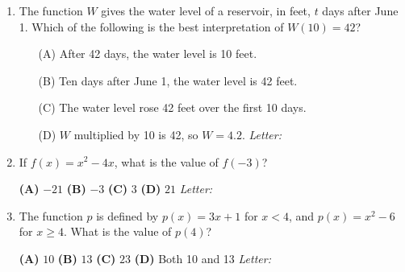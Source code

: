 \documentclass[10pt]{article}
\begin{document}
\begin{enumerate}[leftmargin=1.9em, itemsep=12pt]

\item The function $W$ gives the water level of a reservoir, in feet, $t$ days after June 1.
      Which of the following is the best interpretation of $W(10) = 42$?
      \begin{enumerate}[leftmargin=2.6em, itemsep=2pt]
        \item[(A)] After 42 days, the water level is 10 feet.
        \item[(B)] Ten days after June 1, the water level is 42 feet.
        \item[(C)] The water level rose 42 feet over the first 10 days.
        \item[(D)] $W$ multiplied by 10 is 42, so $W = 4.2$. \hfill\textit{Letter:}~\gradedblank[id=ap1, type=choice, points=1, answer=B]{0.42in}{13pt}
      \end{enumerate}

\item If $f(x) = x^2 - 4x$, what is the value of $f(-3)$?

      \smallskip
      \textbf{(A)} $-21$ \hspace{2.2em} \textbf{(B)} $-3$ \hspace{2.2em} \textbf{(C)} $3$ \hspace{2.2em} \textbf{(D)} $21$ \hfill\textit{Letter:}~\gradedblank[id=ap2, type=choice, points=1, answer=D]{0.42in}{13pt}

\item The function $p$ is defined by $p(x) = 3x + 1$ for $x < 4$, and $p(x) = x^2 - 6$ for
      $x \ge 4$. What is the value of $p(4)$?

      \smallskip
      \textbf{(A)} $10$ \hspace{2.2em} \textbf{(B)} $13$ \hspace{2.2em} \textbf{(C)} $23$ \hspace{2.2em} \textbf{(D)} Both 10 and 13 \hfill\textit{Letter:}~\gradedblank[id=ap3, type=choice, points=1, answer=A]{0.42in}{13pt}


\end{enumerate}
\end{document}

